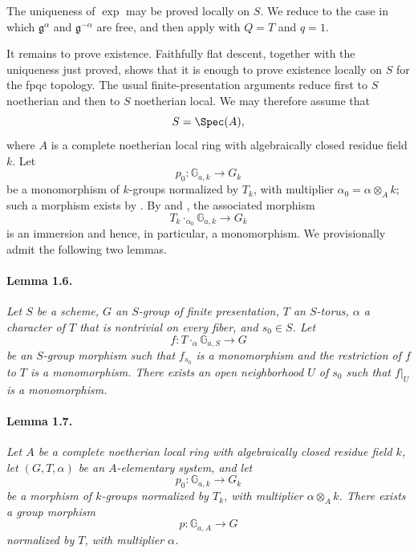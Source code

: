 The uniqueness of \(\exp\) may be proved locally on \(S\). We reduce
to the case in which \(\mathfrak g^\alpha\) and
\(\mathfrak g^{-\alpha}\) are free, and then apply  with
\(Q=T\) and \(q=1\).

It remains to prove existence. Faithfully flat descent, together
with the uniqueness just proved, shows that it is enough to prove
existence locally on \(S\) for the fpqc topology. The usual
finite-presentation arguments reduce first to \(S\) noetherian and
then to \(S\) noetherian local. We may therefore assume that
\[
  S=\Spec(A),
\]
where \(A\) is a complete noetherian local ring with algebraically
closed residue field \(k\). Let
\[
  p_0\colon\mathbb G_{a,k}\longrightarrow G_k
\]
be a monomorphism of \(k\)-groups normalized by \(T_k\), with
multiplier
\(\alpha_0=\alpha\otimes_A k\); such a morphism exists by .
By  and , the associated morphism
\[
  T_k\mathbin{\cdot_{\alpha_0}}\mathbb G_{a,k}
    \longrightarrow G_k
\]
is an immersion and hence, in particular, a monomorphism. We
provisionally admit the following two lemmas.

\paragraph{\textbf{Lemma 1.6.}}
\emph{Let \(S\) be a scheme, \(G\) an \(S\)-group of finite
presentation, \(T\) an \(S\)-torus, \(\alpha\) a character of \(T\)
that is nontrivial on every fiber, and \(s_0\in S\). Let
\[
  f\colon T\mathbin{\cdot_\alpha}\mathbb G_{a,S}\longrightarrow G
\]
be an \(S\)-group morphism such that \(f_{s_0}\) is a monomorphism
and the restriction of \(f\) to \(T\) is a monomorphism. There
exists an open neighborhood \(U\) of \(s_0\) such that
\(f|_U\) is a monomorphism.}

\paragraph{\textbf{Lemma 1.7.}}
\emph{Let \(A\) be a complete noetherian local ring with
algebraically closed residue field \(k\), let
\((G,T,\alpha)\) be an \(A\)-elementary system, and let
\[
  p_0\colon\mathbb G_{a,k}\longrightarrow G_k
\]
be a morphism of \(k\)-groups normalized by \(T_k\), with
multiplier \(\alpha\otimes_A k\). There exists a group morphism
\[
  p\colon\mathbb G_{a,A}\longrightarrow G
\]
normalized by \(T\), with multiplier \(\alpha\).}

